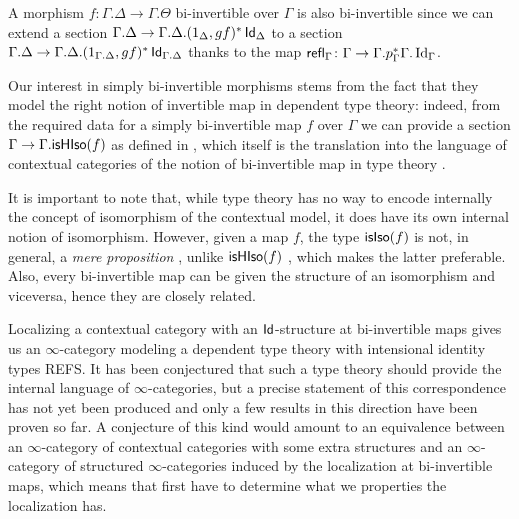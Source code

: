 \begin{rmk}
  A morphism $f\colon\Gamma.\Delta\rightarrow\Gamma.\Theta$ bi-invertible over
  $\Gamma$ is also bi-invertible since we can extend a section
  $\Gamma.\Delta\rightarrow\Gamma.\Delta.(1_\Delta,gf)^*\operatorname{\mathsf{Id}}_\Delta$
  to a section
  $\Gamma.\Delta\rightarrow\Gamma.\Delta.(1_{\Gamma.\Delta},gf)^*\operatorname{\mathsf{Id}}_{\Gamma.\Delta}$
  thanks to the map
  $\operatorname{\mathsf{refl}}_\Gamma\colon\Gamma\rightarrow\Gamma.p^*_\Gamma\Gamma.\operatorname{Id}_\Gamma$.
\end{rmk}

\begin{rmk}
  Our interest in simply bi-invertible morphisms stems from the fact that they
  model the right notion of invertible map in dependent type theory: indeed,
  from the
  required data for a simply bi-invertible map $f$ over $\Gamma$ we can provide
  a section $\Gamma\rightarrow\Gamma.\mathsf{isHIso}({f})$ 
  as defined in \cite[Def.~B.3.3]{KL12}, which itself is the translation into
  the language of contextual categories of the notion of bi-invertible map in
  type theory \cite[Def~4.3.1]{Uni13}.

  It is important to note that, while type theory has no way to encode
  internally the concept of isomorphism of the contextual model, it does have
  its own internal notion of isomorphism. However, given a map $f$, the type
  $\mathsf{isIso}({f})$ is not, in general, a \emph{mere proposition}
  \cite[Def.~3.3.1]{Uni13}, unlike $\mathsf{isHIso}({f})$
  \cite[Thm.~4.3.2]{Uni13}, which makes the latter
  preferable. Also, every bi-invertible map can be given the structure of an
  isomorphism and viceversa, hence they are closely related.
\end{rmk}

\begin{rmk}
Localizing a contextual category with an $\operatorname{\mathsf{Id}}$-structure at bi-invertible maps
gives us an $\infty$-category modeling a dependent type theory with intensional
identity types REFS. It has been conjectured that such a type theory should
provide the internal language of $\infty$-categories, but a precise statement of
this correspondence has not yet been produced and only a few results in this
direction have
been proven so far. A conjecture of this kind would amount to an equivalence
between
an $\infty$-category of contextual categories with some extra structures and an
$\infty$-category of structured $\infty$-categories induced by the localization
at bi-invertible maps, which means that first have to determine what we
properties the localization has.
\end{rmk}

